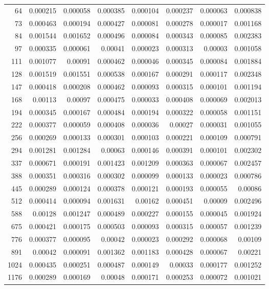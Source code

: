\begin{tabular}{r r r r r r r r}
64 & 0.000215 & 0.000058 & 0.000385 & 0.000104 & 0.000237 & 0.000063 & 0.000838 \\
73 & 0.000463 & 0.000194 & 0.000427 & 0.000081 & 0.000278 & 0.000017 & 0.001168 \\
84 & 0.001544 & 0.001652 & 0.000496 & 0.000084 & 0.000343 & 0.000085 & 0.002383 \\
97 & 0.000335 & 0.000061 & 0.00041 & 0.000023 & 0.000313 & 0.00003 & 0.001058 \\
111 & 0.001077 & 0.00091 & 0.000462 & 0.000046 & 0.000345 & 0.000084 & 0.001884 \\
128 & 0.001519 & 0.001551 & 0.000538 & 0.000167 & 0.000291 & 0.000117 & 0.002348 \\
147 & 0.000418 & 0.000208 & 0.000462 & 0.000093 & 0.000315 & 0.000101 & 0.001194 \\
168 & 0.00113 & 0.00097 & 0.000475 & 0.000033 & 0.000408 & 0.000069 & 0.002013 \\
194 & 0.000345 & 0.000167 & 0.000484 & 0.000194 & 0.000322 & 0.000058 & 0.001151 \\
222 & 0.000377 & 0.000059 & 0.000408 & 0.000036 & 0.00027 & 0.000031 & 0.001055 \\
256 & 0.000269 & 0.000133 & 0.000301 & 0.000103 & 0.000221 & 0.000109 & 0.000791 \\
294 & 0.001281 & 0.001284 & 0.00063 & 0.000146 & 0.000391 & 0.000101 & 0.002302 \\
337 & 0.000671 & 0.000191 & 0.001423 & 0.001209 & 0.000363 & 0.000067 & 0.002457 \\
388 & 0.000351 & 0.000316 & 0.000302 & 0.000099 & 0.000133 & 0.000023 & 0.000786 \\
445 & 0.000289 & 0.000124 & 0.000378 & 0.000121 & 0.000193 & 0.000055 & 0.00086 \\
512 & 0.000414 & 0.000094 & 0.001631 & 0.00162 & 0.000451 & 0.00009 & 0.002496 \\
588 & 0.00128 & 0.001247 & 0.000489 & 0.000227 & 0.000155 & 0.000045 & 0.001924 \\
675 & 0.000421 & 0.000175 & 0.000503 & 0.000093 & 0.000315 & 0.000057 & 0.001239 \\
776 & 0.000377 & 0.000095 & 0.00042 & 0.000023 & 0.000292 & 0.000068 & 0.00109 \\
891 & 0.00042 & 0.000091 & 0.001362 & 0.001183 & 0.000428 & 0.000067 & 0.00221 \\
1024 & 0.000435 & 0.000251 & 0.000487 & 0.000149 & 0.00033 & 0.000177 & 0.001252 \\
1176 & 0.000289 & 0.000169 & 0.00048 & 0.000171 & 0.000253 & 0.000072 & 0.001021 \\

\end{tabular}
